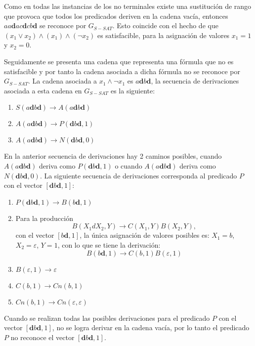 Como en todas las instancias de los no terminales existe una sustitución de rango que provoca que todos los predicados deriven en la cadena vacía, entonces $aa\mathbf{d}ac\mathbf{d}cb\mathbf{d}$ se reconoce por $G_{S-SAT}$. 
Esto coincide con el hecho de que $(x_1 \vee x_2) \wedge (x_1) \wedge (\neg x_2)$ es satisfacible, para la asignación de valores $x_1=1$ y $x_2=0$.

Seguidamente se presenta una cadena que representa una fórmula que no es satisfacible y por tanto la cadena asociada
a dicha fórmula no se reconoce por $G_{S-SAT}$. La cadena asociada a $x_1 \wedge \neg x_1$ es $a\mathbf{d}b\mathbf{d}$,
la secuencia de derivaciones asociada a esta cadena en $G_{S-SAT}$ es la siguiente:

\begin{enumerate}
    \item $S(a\mathbf{d}b\mathbf{d})\to A(a\mathbf{d}b\mathbf{d})$
    \item $A(a\mathbf{d}b\mathbf{d})\to P(\mathbf{d}b\mathbf{d},1)$
    \item $A(a\mathbf{d}b\mathbf{d})\to N(\mathbf{d}b\mathbf{d},0)$
\end{enumerate}

En la anterior secuencia de derivaciones hay 2 caminos posibles, cuando $A(a\mathbf{d}b\mathbf{d})$ deriva como
$P(\mathbf{d}b\mathbf{d},1)$ o cuando $A(a\mathbf{d}b\mathbf{d})$ deriva como $N(\mathbf{d}b\mathbf{d},0)$. La 
siguiente secuencia de derivaciones corresponda al predicado $P$ con el vector $[\mathbf{d}b\mathbf{d},1]$:

\begin{enumerate}[start=2]
    \item $P(\mathbf{d}b\mathbf{d},1) \to B(b\mathbf{d},1)$
    \item Para la producción $$B(X_1dX_2,Y)\to C(X_1,Y) B(X_2,Y),$$ con el vector $[b\mathbf{d},1]$,
          la única asignación de valores posibles es: $X_1=b$, $X_2=\varepsilon$, $Y=1$, con lo que se tiene la derivación:
          $$B(b\mathbf{d},1)\to C(b,1) B(\varepsilon,1)$$
    \item $B(\varepsilon,1) \to \varepsilon$
    \item $C(b,1)\to Cn(b,1)$
    \item $Cn(b,1)\to Cn(\varepsilon,\varepsilon)$
\end{enumerate}

Cuando se realizan todas las posibles derivaciones para el predicado $P$ con el vector $[\mathbf{d}b\mathbf{d},1]$, no se logra derivar en la cadena
vacía, por lo tanto el predicado $P$ no reconoce el vector $[\mathbf{d}b\mathbf{d},1]$.

